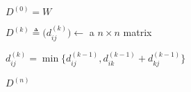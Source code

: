 
\begin{algorithm}[H]
  \begin{algorithmic}[1]
      \State $D^{(0)} = W$

      \hStatex
	\State $D^{(k)} \triangleq \Big( d_{ij}^{(k)} \Big) \gets$ a  $n \times n$ matrix

	\hStatex 
	    \State $d_{ij}^{(k)} = \min \Big\{ d_{ij}^{(k-1)}, d_{ik}^{(k-1)} + d_{kj}^{(k-1)} \Big\}$
	  \EndFor
	\EndFor
      \EndFor

      \hStatex
      \State \Return $D^{(n)}$
    \EndProcedure
  \end{algorithmic}
\end{algorithm}

